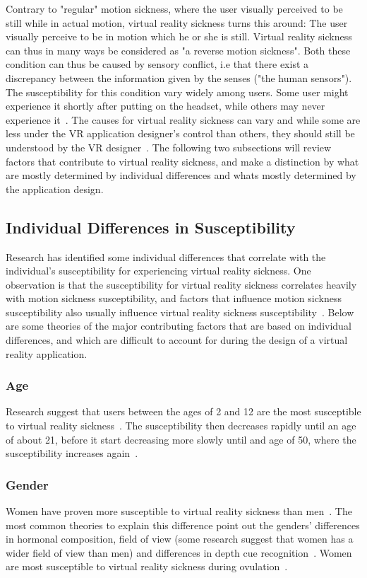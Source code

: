 Contrary to "regular" motion sickness, where the user visually perceived to be still while in actual motion, 
virtual reality sickness turns this around: The user visually perceive to be in motion which he or she is still. 
Virtual reality sickness can thus in many ways be considered as "a reverse motion sickness". Both these condition can thus be caused by
sensory conflict, i.e that there exist a discrepancy between the information given by the senses ("the human sensors").
The susceptibility for this condition vary widely among users. Some user might experience it shortly after putting on the headset, 
while others may never experience it~\citep{Stanney2003}.
The causes for virtual reality sickness can vary and while some are less under the VR application designer's control than others, 
they should still be understood by the VR designer~\citep{Stanney2003}. 
The following two subsections will review factors that contribute to virtual reality sickness, and make a distinction by
what are mostly determined by individual differences and whats mostly determined by the application design. 

\subsection{Individual Differences in Susceptibility}
Research has identified some individual differences that correlate with the individual's susceptibility for experiencing virtual reality sickness. 
One observation is that the susceptibility for virtual reality sickness correlates heavily with motion sickness susceptibility, and 
factors that influence motion sickness susceptibility also usually influence virtual reality sickness susceptibility~\citep{Stanney2003}.
Below are some theories of the major contributing factors that are based on individual differences, and which are difficult to account for during the design of a virtual reality application.


\subsubsection{Age}
Research suggest that users between the ages of 2 and 12 are the most susceptible to virtual reality sickness~\citep{Kolasinski1995}. The susceptibility then decreases
rapidly until an age of about 21, before it start decreasing more slowly until and age of 50, where the susceptibility increases again~\citep{Brooks2010}.

\subsubsection{Gender}
Women have proven more susceptible to virtual reality sickness than men~\citep{Kennedy1985}. The most common theories to explain this difference point out the genders' differences
in hormonal composition, field of view (some research suggest that women has a wider field of view than men) and differences in depth cue recognition~\citep{Biomed2012}. 
Women are most susceptible to virtual reality sickness during ovulation~\citep{Clemes2005}.

